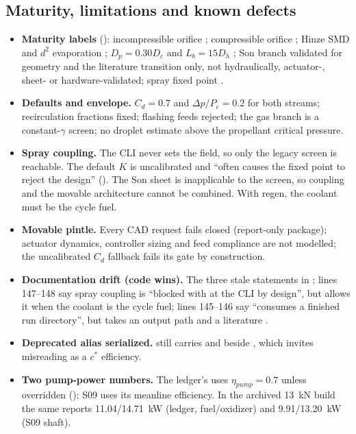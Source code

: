 \subsection{Maturity, limitations and known defects}

\begin{itemize}
\item \textbf{Maturity labels} (): incompressible
orifice ; compressible orifice
; Hinze SMD and $d^2$ evaporation
; $D_p=0.30D_c$ and $L_b=15D_h$
; Son branch validated for geometry and the literature
transition only, not hydraulically, actuator-, sheet- or hardware-validated; spray fixed point
.
\item \textbf{Defaults and envelope.} $C_d=0.7$ and $\Delta p/P_c=0.2$ for both
streams; recirculation fractions fixed; flashing feeds rejected; the gas branch is
a constant-$\gamma$ screen; no droplet estimate above the propellant critical
pressure.
\item \textbf{Spray coupling.} The CLI never sets the  field, so only
the legacy screen is reachable. The default $K$ is uncalibrated and ``often causes
the fixed point to reject the design'' (). The Son
sheet is inapplicable to the screen, so coupling and the movable architecture
cannot be combined. With regen, the coolant must be the cycle fuel.
\item \textbf{Movable pintle.} Every CAD request fails closed (report-only
package); actuator dynamics, controller sizing and feed compliance are not
modelled; the uncalibrated $C_d$ fallback fails its gate by construction.
\item \textbf{Documentation drift (code wins).} The three stale statements in
; 
lines 147--148 say spray coupling is ``blocked with  at the CLI by design'',
but  allows it when the coolant is the cycle fuel;
lines 145--146 say  ``consumes a finished run
directory'', but   takes an output path and a
literature .
\item \textbf{Deprecated alias serialized.}  still carries
 and 
beside , which invites misreading as a $c^*$ efficiency.
\item \textbf{Two pump-power numbers.} The ledger's 
uses $\eta_{pump}=0.7$ unless overridden (); S09 uses
its meanline efficiency. In the archived 13~kN build the same 
reports 11.04/14.71~kW (ledger, fuel/oxidizer) and 9.91/13.20~kW (S09 shaft).
\end{itemize}

